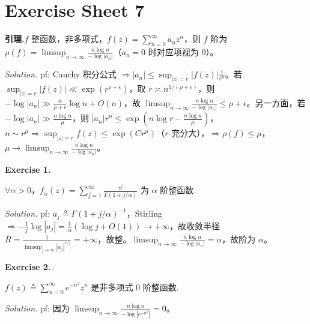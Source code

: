 \documentclass[
	colors = true,
	geometry = b5,
	fontsetup = font-setup-overleaf.tex,
	titlesetup = titles-setup.tex
]{AJbook}
\newenvironment{sheetexercise}[1]{%
	\par\medskip
	\noindent\textbf{Exercise #1.}\enspace
}{%
	\par\smallskip
}
\newenvironment{solution}{%
	\par\smallskip
	\noindent\textit{Solution.}\enspace
}{%
	\par\smallskip
}
\begin{document}
\chapter{Exercise Sheet 7}
\noindent\textbf{引理.}\enspace $f$ 整函数，非多项式，$f(z)=\sum_{n=0}^{\infty}a_nz^n$，则 $f$ 阶为 $\rho(f)=\limsup_{n\to\infty}\frac{n\log n}{-\log|a_n|}$（$a_n=0$ 时对应项视为 $0$）。
\begin{solution}pf: Cauchy 积分公式 $\Rightarrow |a_n|\leq \sup_{|z|=r}|f(z)|\frac1{r^n}$。若 $\sup_{|z|=r}|f(z)|\ll\exp(r^{\rho+\epsilon})$，取 $r\asymp n^{1/(\rho+\epsilon)}$，则 $-\log|a_n|\gg\frac{n}{\rho+\epsilon}\log n+O(n)$，故 $\limsup_{n\to\infty}\frac{n\log n}{-\log|a_n|}\leq\rho+\epsilon$。另一方面，若 $-\log|a_n|\gg\frac{n\log n}{\mu}$，则 $|a_n|r^n\leq\exp(n\log r-\frac{n\log n}{\mu})$，$n\sim r^\mu\Rightarrow\sup_{|z|=r}f(z)\leq\exp(Cr^\mu)$（$r$ 充分大），$\Rightarrow\rho(f)\leq\mu$，$\mu\to\limsup_{n\to\infty}\frac{n\log n}{-\log|a_n|}$。\end{solution}

\begin{sheetexercise}{1}
$\forall\alpha>0$，$f_\alpha(z)=\sum_{j=1}^{\infty}\frac{z^j}{\Gamma(1+j/\alpha)}$ 为 $\alpha$ 阶整函数.
\end{sheetexercise}
\begin{solution}pf: $a_j\triangleq\Gamma(1+j/\alpha)^{-1}$，Stirling $\Rightarrow-\frac1j\log|a_j|=\frac1\alpha(\log j+O(1))\to+\infty$，故收敛半径 $R=\frac1{\limsup_{j\to\infty}|a_j|^{1/j}}=+\infty$，故整。$\limsup_{n\to\infty}\frac{n\log n}{-\log|a_n|}=\alpha$，故阶为 $\alpha$。\end{solution}
\begin{sheetexercise}{2}
$f(z)\triangleq\sum_{n=0}^{\infty}e^{-n^2}z^n$ 是非多项式 $0$ 阶整函数.
\end{sheetexercise}
\begin{solution}pf: 因为 $\limsup_{n\to\infty}\frac{n\log n}{-\log|e^{-n^2}|}=0$。\end{solution}
\end{document}
